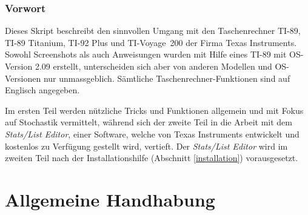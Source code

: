 \documentclass[a4paper,11pt,notitlepage,halfparskip,headsepline,normalheadings,twoside]{scrartcl}
\begin{document}
\section{Vorwort}
Dieses Skript beschreibt den sinnvollen Umgang mit den Taschenrechner TI-89,
TI-89 Titanium, TI-92 Plus und TI-Voyage\texttrademark~200 der Firma Texas
Instruments. Sowohl Screenshots als auch Anweisungen wurden mit Hilfe eines
TI-89 mit OS-Version 2.09 erstellt, unterscheiden sich aber von anderen Modellen
und OS-Versionen nur unmassgeblich. Sämtliche Taschenrechner-Funktionen sind auf
Englisch angegeben.

Im ersten Teil werden nützliche Tricks und Funktionen allgemein und mit Fokus
auf Stochastik vermittelt, während sich der zweite Teil in die Arbeit mit dem
\textit{Stats/List Editor}, einer Software, welche von Texas Instruments
entwickelt und kostenlos zu Verfügung gestellt wird, vertieft. Der
\textit{Stats/List Editor} wird im zweiten Teil nach der Installationshilfe
(Abschnitt \ref{installation}) vorausgesetzt.

\newpage


\tableofcontents
\newpage

\part{Allgemeine Handhabung}
\end{document}
